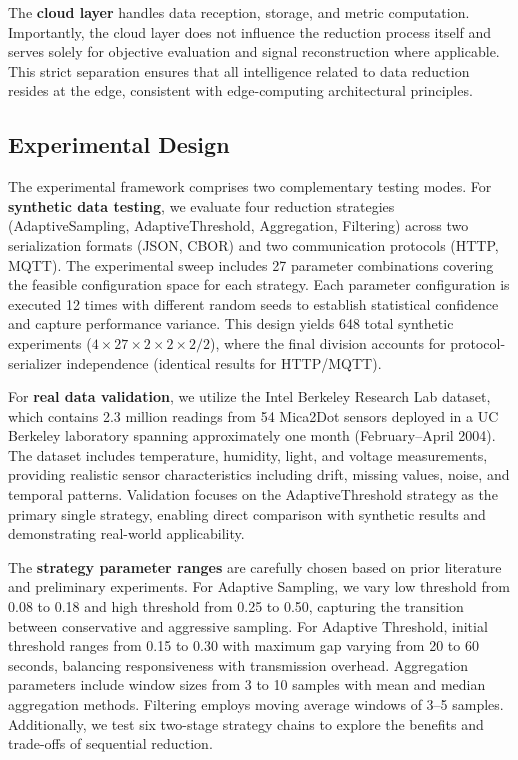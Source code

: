 \documentclass[10pt,twocolumn]{article}
\begin{document}
The \textbf{cloud layer} handles data reception, storage, and metric computation. Importantly, the cloud layer does not influence the reduction process itself and serves solely for objective evaluation and signal reconstruction where applicable. This strict separation ensures that all intelligence related to data reduction resides at the edge, consistent with edge-computing architectural principles.

\vspace{0.15cm}

\subsection{Experimental Design}

The experimental framework comprises two complementary testing modes. For \textbf{synthetic data testing}, we evaluate four reduction strategies (AdaptiveSampling, AdaptiveThreshold, Aggregation, Filtering) across two serialization formats (JSON, CBOR) and two communication protocols (HTTP, MQTT). The experimental sweep includes 27 parameter combinations covering the feasible configuration space for each strategy. Each parameter configuration is executed 12 times with different random seeds to establish statistical confidence and capture performance variance. This design yields 648 total synthetic experiments ($4 \times 27 \times 2 \times 2 \times 2 / 2$), where the final division accounts for protocol-serializer independence (identical results for HTTP/MQTT).

For \textbf{real data validation}, we utilize the Intel Berkeley Research Lab dataset, which contains 2.3 million readings from 54 Mica2Dot sensors deployed in a UC Berkeley laboratory spanning approximately one month (February--April 2004). The dataset includes temperature, humidity, light, and voltage measurements, providing realistic sensor characteristics including drift, missing values, noise, and temporal patterns. Validation focuses on the AdaptiveThreshold strategy as the primary single strategy, enabling direct comparison with synthetic results and demonstrating real-world applicability.

The \textbf{strategy parameter ranges} are carefully chosen based on prior literature and preliminary experiments. For Adaptive Sampling, we vary low threshold from 0.08 to 0.18 and high threshold from 0.25 to 0.50, capturing the transition between conservative and aggressive sampling. For Adaptive Threshold, initial threshold ranges from 0.15 to 0.30 with maximum gap varying from 20 to 60 seconds, balancing responsiveness with transmission overhead. Aggregation parameters include window sizes from 3 to 10 samples with mean and median aggregation methods. Filtering employs moving average windows of 3--5 samples. Additionally, we test six two-stage strategy chains to explore the benefits and trade-offs of sequential reduction.
\end{document}
